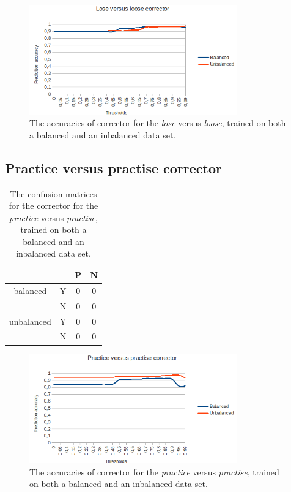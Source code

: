 \documentclass[12pt]{article}
\begin{document}
\begin{figure}[H]
\centering
\includegraphics[width=0.8\textwidth]{accuracy_loseloose.png}
\caption{The accuracies of corrector for the \emph{lose} versus \emph{loose}, trained on both a balanced and an inbalanced data set.}
\end{figure}

\subsection{Practice versus practise corrector}

\begin{table}[H] \footnotesize
\centering
\begin{tabular}{|c|c|c|c|}
\hline
&&P&N\\
\hline
balanced&Y&0&0\\
&N&0&0\\
\hline
\hline
unbalanced&Y&0&0\\
&N&0&0\\
\hline
\end{tabular}
\caption{The confusion matrices for the corrector for the \emph{practice} versus \emph{practise}, trained on both a balanced and an inbalanced data set.}
\end{table}

\begin{figure}[H]
\centering
\includegraphics[width=0.8\textwidth]{accuracy_practicepractise.png}
\caption{The accuracies of corrector for the \emph{practice} versus \emph{practise}, trained on both a balanced and an inbalanced data set.}
\end{figure}
\end{document}
